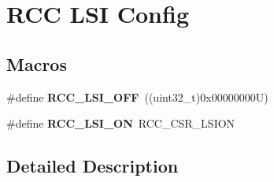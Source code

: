 \hypertarget{group___r_c_c___l_s_i___config}{}\section{R\+CC L\+SI Config}
\label{group___r_c_c___l_s_i___config}
\subsection*{Macros}
\begin{DoxyCompactItemize}
\item 
\mbox{\label{group___r_c_c___l_s_i___config_gaa1710927d79a2032f87f039c4a27356a}} 
\#define {\bfseries R\+C\+C\+\_\+\+L\+S\+I\+\_\+\+O\+FF}~((uint32\+\_\+t)0x00000000\+U)
\item 
\mbox{\label{group___r_c_c___l_s_i___config_ga6b364ac3500e60b6bff695ee518c87d6}} 
\#define {\bfseries R\+C\+C\+\_\+\+L\+S\+I\+\_\+\+ON}~R\+C\+C\+\_\+\+C\+S\+R\+\_\+\+L\+S\+I\+ON
\end{DoxyCompactItemize}


\subsection{Detailed Description}
